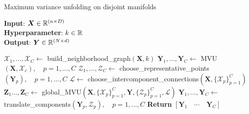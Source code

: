 \documentclass{article} %
\begin{document}
\begin{algorithm}[tb]
\caption{Maximum variance unfolding on disjoint manifolds}
\label{alg:mvudm}
\textbf{Input}: $\bm{X}\in\mathbb{R}^{(n\times D)}$ \\
\textbf{Hyperparameter}: $k\in\mathbb{R}$\\
\textbf{Output}: $\bm{Y}\in\mathbb{R}^{(N\times d)}$
\begin{algorithmic}[1] %
\STATE $\mathcal{X}_1,\dotsc,\mathcal{X}_C \leftarrow $ build\_neighborhood\_graph$(\bm{X}, k)$
\STATE $\bm{Y}_1,\dotsc,\bm{Y}_C \leftarrow $ MVU$(\bm{X}, \mathcal{X}_c),\quad p=1,\dotsc,C$
\STATE $\mathcal{Z}_1,\dotsc,\mathcal{Z}_C \leftarrow $ choose\_representative\_points$(\bm{Y}_p),\quad p=1,\dotsc,C$
\STATE $\mathcal{L} \leftarrow $ choose\_intercomponent\_connections$(\bm{X}, \{\mathcal{X}_p\}_{p=1}^{C})$
\STATE $\bm{Z}_1\dotsc,\bm{Z}_C \leftarrow $ global\_MVU$(\bm{X},\{\mathcal{X}_p\}_{p=1}^{C},\bm{Y},\{\mathcal{Z}_p\}_{p=1}^{C}, \mathcal{L})$
\STATE $\bm{Y}_1,\dotsc,\bm{Y}_C \leftarrow $ translate\_components$(\bm{Y}_p,\mathcal{Z}_p),\quad p=1,\dotsc,C$
\STATE \textbf{Return} $[\bm{Y}_1\quad\cdots\quad\bm{Y}_C]$
\end{algorithmic}
\end{algorithm}
\end{document}
